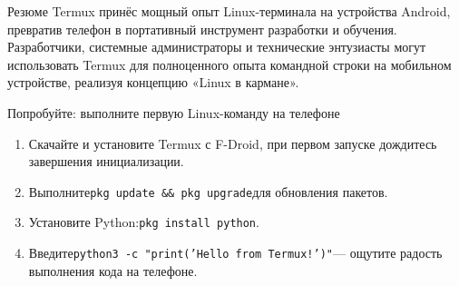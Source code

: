 \begin{tcbinfo}{Резюме}
Termux принёс мощный опыт Linux-терминала на устройства Android, превратив телефон в портативный инструмент разработки и обучения. Разработчики, системные администраторы и технические энтузиасты могут использовать Termux для полноценного опыта командной строки на мобильном устройстве, реализуя концепцию «Linux в кармане».

\end{tcbinfo}

\begin{tcbpractice}{Попробуйте: выполните первую Linux-команду на телефоне}
\begin{enumerate}
  \item Скачайте и установите Termux с F-Droid, при первом запуске дождитесь завершения инициализации.
  \item Выполните\texttt{pkg update \&\& pkg upgrade}для обновления пакетов.
  \item Установите Python:\texttt{pkg install python}.
  \item Введите\texttt{python3 -\allowbreak c "print('Hello from Termux!')"}— ощутите радость выполнения кода на телефоне.
\end{enumerate}

\end{tcbpractice}

